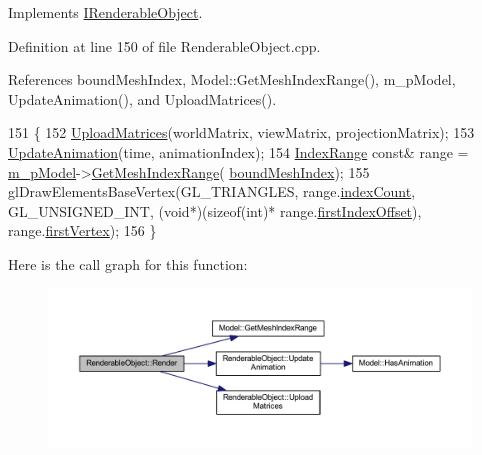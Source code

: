 Implements \hyperlink{class_i_renderable_object_a6f47f692684ec70b5b776c0884495059}{I\+Renderable\+Object}.



Definition at line 150 of file Renderable\+Object.\+cpp.



References bound\+Mesh\+Index, Model\+::\+Get\+Mesh\+Index\+Range(), m\+\_\+p\+Model, Update\+Animation(), and Upload\+Matrices().


\begin{DoxyCode}
151 \{
152   \hyperlink{class_renderable_object_ac504cf0d249e194eda261b45f629a7b8}{UploadMatrices}(worldMatrix, viewMatrix, projectionMatrix);
153   \hyperlink{class_renderable_object_a843661db2d38d1a74ff974539dc3d257}{UpdateAnimation}(time, animationIndex);
154   \hyperlink{struct_index_range}{IndexRange} \textcolor{keyword}{const}& range = \hyperlink{class_renderable_object_aab96dcc31d9e748645868c9449ae8cb6}{m\_pModel}->\hyperlink{class_model_a24eb1631a6274af5e2df089f3cb18ac8}{GetMeshIndexRange}(
      \hyperlink{class_renderable_object_abcef64954c2b642329db5a14a66a6fd6}{boundMeshIndex});
155   glDrawElementsBaseVertex(GL\_TRIANGLES, range.\hyperlink{struct_index_range_ab1928b14e6f6877973fa6679257385bb}{indexCount}, GL\_UNSIGNED\_INT, (\textcolor{keywordtype}{void}*)(\textcolor{keyword}{sizeof}(\textcolor{keywordtype}{int})*
      range.\hyperlink{struct_index_range_a0e0e760f6a861003bf6be8466671e1b5}{firstIndexOffset}), range.\hyperlink{struct_index_range_a2e9aff1a8e3762185aada41ff99c5cfc}{firstVertex});
156 \}
\end{DoxyCode}


Here is the call graph for this function\+:\nopagebreak
\begin{figure}[H]
\begin{center}
\leavevmode
\includegraphics[width=350pt]{class_renderable_object_a5e56c1423e5c59a2b8858645b5b7936d_cgraph}
\end{center}
\end{figure}


